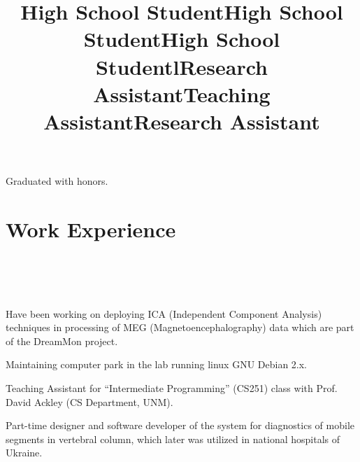 \documentclass[10pt,overlapped,line]{res}
\begin{document}
\begin{resume}
\title{High School Student}
\begin{position}
 Graduated with honors.
\end{position}

\title{High School Student}
\begin{position}
\end{position}


\title{High School Student}
\begin{position}
\end{position}
 

\section{Work Experience}
\begin{format}
  \title{l}\\
  \\
  \body\\
\end{format}


\title{Research Assistant}
\begin{position}
  Have been working  on deploying ICA (Independent Component
  Analysis) techniques in processing of MEG (Magnetoencephalography)
  data which are part of the DreamMon project.
  
  Maintaining computer park in the lab running linux GNU Debian 2.x.

\end{position}

\title{Teaching Assistant}
\begin{position}
  Teaching Assistant for ``Intermediate Programming'' (CS251) class
  with Prof. David Ackley (CS Department, UNM).
\end{position}


\title{Research Assistant}
\begin{position}
Part-time designer and software developer of the system for
diagnostics of mobile segments in vertebral column, which later was
utilized in national hospitals of Ukraine.
\end{position}


\end{resume}
\end{document}
